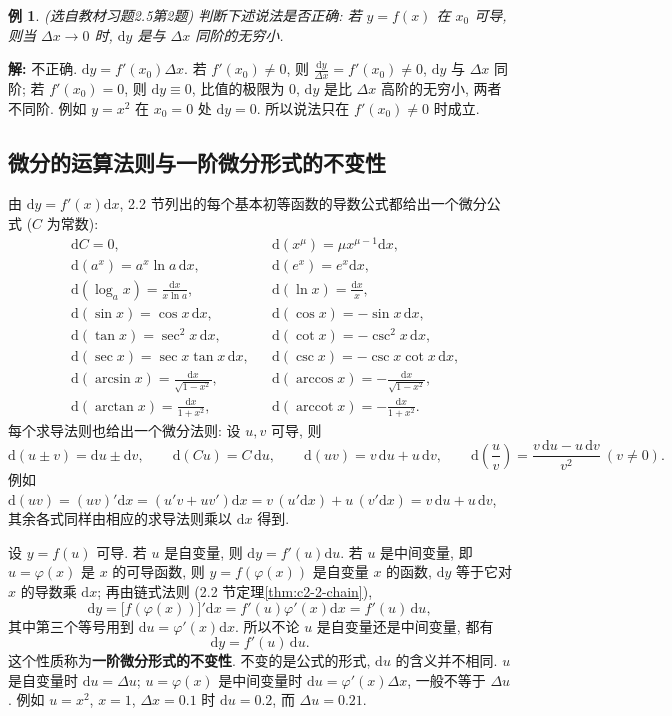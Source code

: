 \documentclass[UTF8,openany]{ctexbook}
\theoremstyle{chinesetextbook}
\newtheorem{example}{例}[section]
\newenvironment{cnsolution}{\par\indent\textbf{解:} \ignorespaces}{\par}
\newcommand{\dd}{\mathrm d}
\begin{document}
\begin{example}\label{ex:c2-h5-2}
\textnormal{(选自教材习题2.5第2题)} 判断下述说法是否正确: 若 $y=f(x)$ 在 $x_0$ 可导, 则当 $\Delta x\to0$ 时, $\dd y$ 是与 $\Delta x$ 同阶的无穷小.
\end{example}
\begin{cnsolution}
不正确. $\dd y=f'(x_0)\Delta x$. 若 $f'(x_0)\ne0$, 则 $\displaystyle\frac{\dd y}{\Delta x}=f'(x_0)\ne0$, $\dd y$ 与 $\Delta x$ 同阶; 若 $f'(x_0)=0$, 则 $\dd y\equiv0$, 比值的极限为 $0$, $\dd y$ 是比 $\Delta x$ 高阶的无穷小, 两者不同阶. 例如 $y=x^2$ 在 $x_0=0$ 处 $\dd y=0$. 所以说法只在 $f'(x_0)\ne0$ 时成立.
\end{cnsolution}
\subsection{微分的运算法则与一阶微分形式的不变性}
由 $\dd y=f'(x)\dd x$, 2.2 节列出的每个基本初等函数的导数公式都给出一个微分公式 ($C$ 为常数):
\[
\begin{aligned}
&\dd C=0, &&\dd(x^\mu)=\mu x^{\mu-1}\dd x,\\
&\dd(a^x)=a^x\ln a\,\dd x, &&\dd(e^x)=e^x\dd x,\\
&\dd(\log_ax)=\frac{\dd x}{x\ln a}, &&\dd(\ln x)=\frac{\dd x}x,\\
&\dd(\sin x)=\cos x\,\dd x, &&\dd(\cos x)=-\sin x\,\dd x,\\
&\dd(\tan x)=\sec^2x\,\dd x, &&\dd(\cot x)=-\csc^2x\,\dd x,\\
&\dd(\sec x)=\sec x\tan x\,\dd x, &&\dd(\csc x)=-\csc x\cot x\,\dd x,\\
&\dd(\arcsin x)=\frac{\dd x}{\sqrt{1-x^2}}, &&\dd(\arccos x)=-\frac{\dd x}{\sqrt{1-x^2}},\\
&\dd(\arctan x)=\frac{\dd x}{1+x^2},\qquad &&\dd(\operatorname{arccot}x)=-\frac{\dd x}{1+x^2}.
\end{aligned}
\]
每个求导法则也给出一个微分法则: 设 $u,v$ 可导, 则
\[
\dd(u\pm v)=\dd u\pm\dd v,\qquad\dd(Cu)=C\,\dd u,\qquad\dd(uv)=v\,\dd u+u\,\dd v,\qquad\dd\left(\frac uv\right)=\frac{v\,\dd u-u\,\dd v}{v^2}\ (v\ne0).
\]
例如 $\dd(uv)=(uv)'\dd x=(u'v+uv')\dd x=v\,(u'\dd x)+u\,(v'\dd x)=v\,\dd u+u\,\dd v$, 其余各式同样由相应的求导法则乘以 $\dd x$ 得到.

设 $y=f(u)$ 可导. 若 $u$ 是自变量, 则 $\dd y=f'(u)\dd u$. 若 $u$ 是中间变量, 即 $u=\varphi(x)$ 是 $x$ 的可导函数, 则 $y=f(\varphi(x))$ 是自变量 $x$ 的函数, $\dd y$ 等于它对 $x$ 的导数乘 $\dd x$; 再由链式法则 (2.2 节定理\ref{thm:c2-2-chain}),
\[
\dd y=\bigl[f(\varphi(x))\bigr]'\dd x=f'(u)\varphi'(x)\dd x=f'(u)\,\dd u,
\]
其中第三个等号用到 $\dd u=\varphi'(x)\dd x$. 所以不论 $u$ 是自变量还是中间变量, 都有
\[
\dd y=f'(u)\,\dd u.
\]
这个性质称为\textbf{一阶微分形式的不变性}. 不变的是公式的形式, $\dd u$ 的含义并不相同. $u$ 是自变量时 $\dd u=\Delta u$; $u=\varphi(x)$ 是中间变量时 $\dd u=\varphi'(x)\Delta x$, 一般不等于 $\Delta u$. 例如 $u=x^2$, $x=1$, $\Delta x=0.1$ 时 $\dd u=0.2$, 而 $\Delta u=0.21$.
\end{document}
